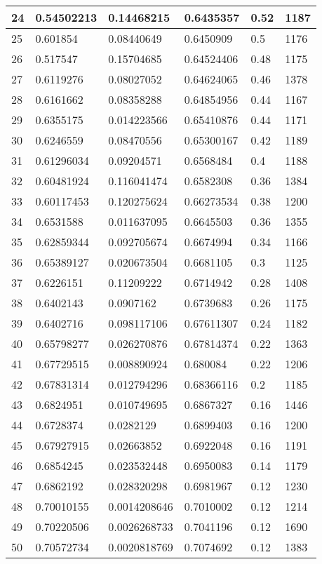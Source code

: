 \begin{longtable}{|l|l|l|l|l|l|}
24 & 0.54502213 & 0.14468215 & 0.6435357 & 0.52 & 1187 \\ \hline 
25 & 0.601854 & 0.08440649 & 0.6450909 & 0.5 & 1176 \\ \hline 
26 & 0.517547 & 0.15704685 & 0.64524406 & 0.48 & 1175 \\ \hline 
27 & 0.6119276 & 0.08027052 & 0.64624065 & 0.46 & 1378 \\ \hline 
28 & 0.6161662 & 0.08358288 & 0.64854956 & 0.44 & 1167 \\ \hline 
29 & 0.6355175 & 0.014223566 & 0.65410876 & 0.44 & 1171 \\ \hline 
30 & 0.6246559 & 0.08470556 & 0.65300167 & 0.42 & 1189 \\ \hline 
31 & 0.61296034 & 0.09204571 & 0.6568484 & 0.4 & 1188 \\ \hline 
32 & 0.60481924 & 0.116041474 & 0.6582308 & 0.36 & 1384 \\ \hline 
33 & 0.60117453 & 0.120275624 & 0.66273534 & 0.38 & 1200 \\ \hline 
34 & 0.6531588 & 0.011637095 & 0.6645503 & 0.36 & 1355 \\ \hline 
35 & 0.62859344 & 0.092705674 & 0.6674994 & 0.34 & 1166 \\ \hline 
36 & 0.65389127 & 0.020673504 & 0.6681105 & 0.3 & 1125 \\ \hline 
37 & 0.6226151 & 0.11209222 & 0.6714942 & 0.28 & 1408 \\ \hline 
38 & 0.6402143 & 0.0907162 & 0.6739683 & 0.26 & 1175 \\ \hline 
39 & 0.6402716 & 0.098117106 & 0.67611307 & 0.24 & 1182 \\ \hline 
40 & 0.65798277 & 0.026270876 & 0.67814374 & 0.22 & 1363 \\ \hline 
41 & 0.67729515 & 0.008890924 & 0.680084 & 0.22 & 1206 \\ \hline 
42 & 0.67831314 & 0.012794296 & 0.68366116 & 0.2 & 1185 \\ \hline 
43 & 0.6824951 & 0.010749695 & 0.6867327 & 0.16 & 1446 \\ \hline 
44 & 0.6728374 & 0.0282129 & 0.6899403 & 0.16 & 1200 \\ \hline 
45 & 0.67927915 & 0.02663852 & 0.6922048 & 0.16 & 1191 \\ \hline 
46 & 0.6854245 & 0.023532448 & 0.6950083 & 0.14 & 1179 \\ \hline 
47 & 0.6862192 & 0.028320298 & 0.6981967 & 0.12 & 1230 \\ \hline 
48 & 0.70010155 & 0.0014208646 & 0.7010002 & 0.12 & 1214 \\ \hline 
49 & 0.70220506 & 0.0026268733 & 0.7041196 & 0.12 & 1690 \\ \hline 
50 & 0.70572734 & 0.0020818769 & 0.7074692 & 0.12 & 1383 \\ \hline 
\end{longtable}
